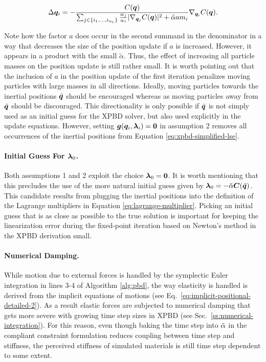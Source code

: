 \begin{equation}\label{eq:xpbd-masses}
    \Delta \bm{q}_i 
    = -\frac{C(\bm{q})}{\sum_{j \in \{ i_1, \ldots, i_{n_c} \}} \frac{w_j}{w_i} \vert \nabla_{\bm{q}_j}C(\bm{q}) \vert^2 + \tilde{\alpha}a m_i} 
    \nabla_{\bm{q}_i} C(\bm{q}).
\end{equation}

\noindent Note how the factor $a$ does occur in the second summand in the denominator in a way that decreases the size of the position update
if $a$ is increased. However, it appears in a product with the small $\tilde{\alpha}$. Thus, the effect of increasing all particle masses on
the position update is still rather small. It is worth pointing out that the inclusion of $a$ in the position update of the first iteration
penalizes moving particles with large masses in all directions. Ideally, moving particles towards the inertial positions $\tilde{\bm{q}}$
should be encouraged whereas as moving particles away from $\tilde{\bm{q}}$ should be discouraged. This directionality is only possible if
$\tilde{\bm{q}}$ is not simply used as an initial guess for the XPBD solver, but also used explicitly in the update equations. However, setting
$\bm{g}(\bm{q}_i, \bm{\lambda}_i) = \bm{0}$ in assumption 2 removes all occurrences of the inertial positions from Equation \ref{eq:xpbd-simplified-lse}.

\paragraph{Initial Guess For $\bm{\lambda}_0$.}
Both assumptions 1 and 2 exploit the choice $\bm{\lambda}_0 = \bm{0}$. It is worth mentioning that this precludes the use of the more natural
initial guess given by $\bm{\lambda}_0 = -\tilde{\mathbf{\alpha}} \bm{C}(\tilde{\bm{q}})$. This candidate results from plugging the 
inertial positions into the
definition of the Lagrange multipliers in Equation \ref{eq:lagrange-multiplier}. Picking an initial guess that is as close as possible to the true
solution is important for keeping the linearization error during the fixed-point iteration based on Newton's method in the XPBD derivation 
small. 

\paragraph{Numerical Damping.}
While motion due to external forces is handled by the symplectic Euler integration in lines 3-4 of Algorithm \ref{alg:pbd}, the way 
elasticity is handled is derived from the implicit equations of motions (see Eq.\ \ref{eq:implicit-positional-detailed-2}). As a result 
elastic forces are subjected to numerical damping that gets more severe with growing time step sizes in XPBD (see Sec.\ \ref{ss:numerical-integration}). 
For this reason, even though baking the time step into $\tilde{\mathbf{\alpha}}$ in the compliant constraint formulation reduces coupling 
between time step and stiffness, the perceived stiffness of simulated materials is still time step dependent to some extent.

